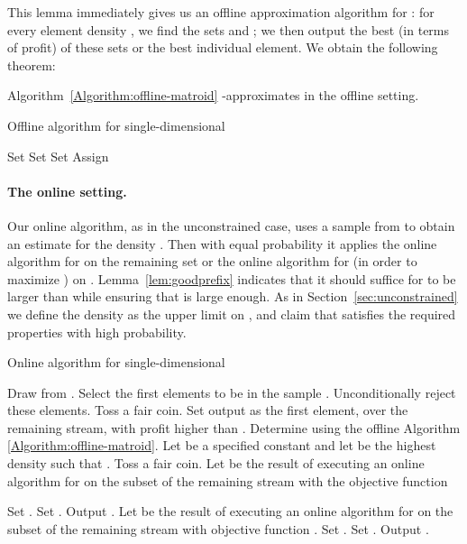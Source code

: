 This lemma immediately gives us an offline approximation algorithm for
: for every element density , we find the
sets  and ; we then output the best (in terms of profit) of these sets or the best individual element. We obtain the following theorem:

\begin{theorem}
\label{theorem:matroid_offline}
Algorithm~\ref{Algorithm:offline-matroid} -approximates
 in the offline setting.  
\end{theorem}


\begin{algorithm}
  \caption{Offline algorithm for single-dimensional }
\label{Algorithm:offline-matroid}
\begin{algorithmic}[1]
\STATE Set 
\STATE Set  
\STATE Set  
\STATE Assign 
\end{algorithmic}
\end{algorithm}

\paragraph{The online setting.}
Our online algorithm, as in the unconstrained case, uses a sample 
from  to obtain an estimate  for the density . Then
with equal probability it applies the online algorithm for
 on the remaining set  or the online
algorithm for  (in order to maximize ) on . Lemma~\ref{lem:goodprefix} indicates
that it should suffice for  to be larger than  while
ensuring that  is large enough. As in
Section~\ref{sec:unconstrained} we define the density  as the
upper limit on , and claim that  satisfies the required
properties with high probability.

\begin{algorithm}
  \caption{Online algorithm for single-dimensional  }\label{Algorithm:online-matroid}
\begin{algorithmic}[1]
\STATE Draw  from .  
\STATE Select the first  elements to
be in the sample . Unconditionally reject these elements.  \STATE
Toss a fair coin.   \STATE Set output  as the first
element, over the remaining stream, with profit higher than .
\ELSE \STATE Determine  using the offline Algorithm
\ref{Algorithm:offline-matroid}.  \STATE Let  be a specified
constant and let  be the highest density such that
.
\STATE \label{step:online-start} Toss a fair coin.  
\STATE \label{step:redn-1} Let  be the result of executing an
online algorithm for  on the subset  of the remaining
stream with the objective function

\STATE Set .  \FOR {} \label{step:for-1} \IF {} \STATE Set .  \ENDIF \ENDFOR
\STATE Output .  \ELSE \STATE\label{step:redn-2} Let  be the result
of executing an online algorithm for  on the subset 
of the remaining stream with objective function .  \STATE
Set .  \FOR {} \label{step:for-2}
\IF {} \STATE Set .  \ENDIF \ENDFOR
\STATE\label{step:online-end} Output .  \ENDIF \ENDIF
\end{algorithmic}
\end{algorithm}
 
